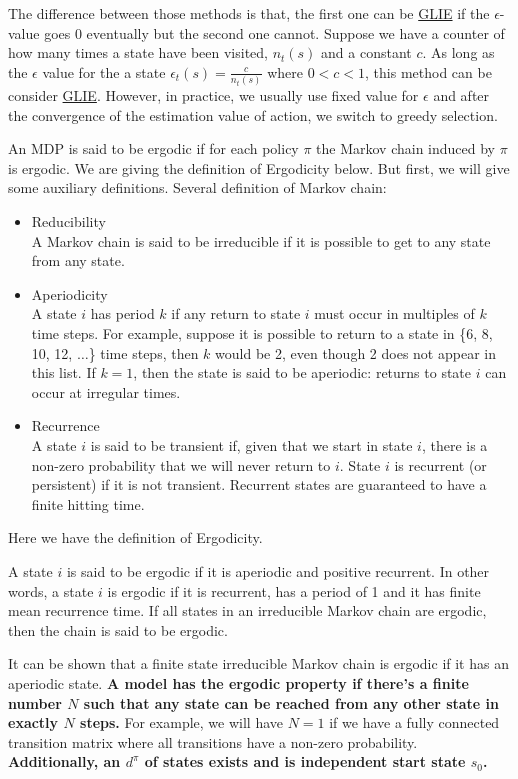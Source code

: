 \documentclass[9pt]{article}
\begin{document}
The difference between those methods is that, the first one can be \hyperlink{glie}{GLIE} if the $\epsilon$-value goes 0 eventually but the second one cannot. Suppose we have a counter of how many times a state have been visited, $n_t(s)$ and a constant $c$. As long as the $\epsilon$ value for the a state $\epsilon_t(s) = \frac{c}{n_t(s)}$ where $0<c<1$, this method can be consider \hyperlink{glie}{GLIE}. However, in practice, we usually use fixed value for $\epsilon$ and after the convergence of the estimation value of action, we switch to greedy selection. 

An MDP is said to be ergodic if for each policy $\pi$ the Markov chain induced by $\pi$ is ergodic.
We are giving the definition of Ergodicity below. But first, we will give some auxiliary definitions.
Several definition of Markov chain:
\begin{itemize}
\item Reducibility\\
A Markov chain is said to be irreducible if it is possible to get to any state from any state.
\item Aperiodicity\\
A state $i$ has period $k$ if any return to state $i$ must occur in multiples of $k$ time steps. For example, suppose it is possible to return to a state in \{6, 8, 10, 12, $\ldots$\} time steps, then $k$ would be 2, even though 2 does not appear in this list. If $k = 1$, then the state is said to be aperiodic: returns to state $i$ can occur at irregular times.
\item Recurrence\\
A state $i$ is said to be transient if, given that we start in state $i$, there is a non-zero probability that we will never return to $i$. State $i$ is recurrent (or persistent) if it is not transient. Recurrent states are guaranteed to have a finite hitting time.
\end{itemize}
Here we have the definition of Ergodicity.

A state $i$ is said to be ergodic if it is aperiodic and positive recurrent. In other words, a state $i$ is ergodic if it is recurrent, has a period of 1 and it has finite mean recurrence time. If all states in an irreducible Markov chain are ergodic, then the chain is said to be ergodic.

It can be shown that a finite state irreducible Markov chain is ergodic if it has an aperiodic state. {\bf A model has the ergodic property if there's a finite number $N$ such that any state can be reached from any other state in exactly $N$ steps.} For example, we will have $N=1$ if we have a fully connected transition matrix where all transitions have a non-zero probability.
{\bf Additionally, an  $d^{\pi}$ of states exists and is independent start state $s_0$.}
\end{document}
